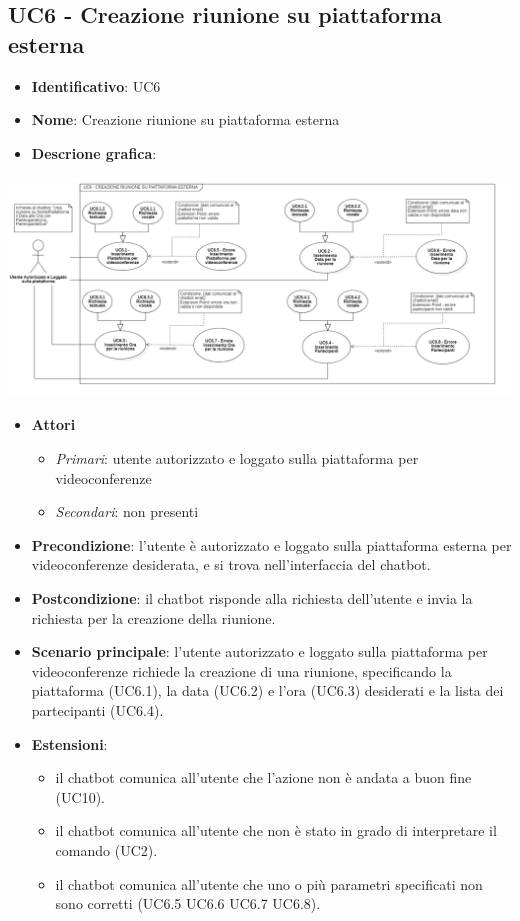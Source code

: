 \subsection{UC6 - Creazione riunione su piattaforma esterna}
\begin{itemize}
    \item \textbf{Identificativo}: UC6
    \item \textbf{Nome}: Creazione riunione su piattaforma esterna
    \item \textbf{Descrione grafica}:
\end{itemize}
\begin{center}
    \includegraphics{images/UC6.png} 
\end{center}
 \begin{itemize}
    \item \textbf{Attori}
 \begin{itemize} 
    \item \textit{Primari}: utente autorizzato e loggato sulla piattaforma per videoconferenze
    \item \textit{Secondari}: non presenti
 \end{itemize}
 \item \textbf{Precondizione}: l'utente è autorizzato e loggato sulla piattaforma esterna per videoconferenze desiderata, e si trova nell'interfaccia del chatbot.
 \item \textbf{Postcondizione}: il chatbot risponde alla richiesta dell'utente e invia la richiesta per la creazione della riunione.
 \item \textbf{Scenario principale}: l'utente autorizzato e loggato sulla piattaforma per videoconferenze richiede la creazione di una riunione, specificando la piattaforma (UC6.1), la data (UC6.2) e l'ora (UC6.3) desiderati e la lista dei partecipanti (UC6.4).
 \item \textbf{Estensioni}: 
 \begin{itemize} 
    \item il chatbot comunica all'utente che l'azione non è andata a buon fine (UC10).
    \item il chatbot comunica all'utente che non è stato in grado di interpretare il comando (UC2).
    \item il chatbot comunica all'utente che uno o più parametri specificati non sono corretti (UC6.5 UC6.6 UC6.7 UC6.8).
 \end{itemize}
\end{itemize}
\newpage
